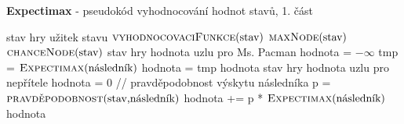 \begin{algorithm}
\caption{\textbf{Expectimax} - pseudokód vyhodnocování hodnot stavů, 1. část}
\label{alg:expectimax}
\begin{algorithmic}[1]

\Require stav hry
\Ensure užitek stavu
    \State \Return $\text{\Call{vyhodnocovaciFunkce}{stav}}$  
  \EndIf
    \State \Return $\text{\Call{maxNode}{stav}}$  
  \EndIf
    \State \Return $\text{\Call{chanceNode}{stav}}$  
  \EndIf
\EndFunction
\algrule
\Require stav hry
\Ensure hodnota uzlu pro Ms. Pacman
    \State hodnota = $-\infty$
    \State tmp = $\text{\Call{Expectimax}{následník}}$
     
        \State hodnota = tmp
      \EndIf
    \EndFor 
    \State \Return hodnota
\EndFunction
\algrule
\Require stav hry
\Ensure hodnota uzlu pro nepřítele
    \State hodnota = 0
    \State // pravděpodobnost výskytu následníka  
    \State p = $\text{\Call{pravděpodobnost}{stav,následník}}$
    \State hodnota += p * $\text{\Call{Expectimax}{následník}}$
    \EndFor
    \State \Return hodnota 
\EndFunction

\end{algorithmic}
\end{algorithm}
\newpage

